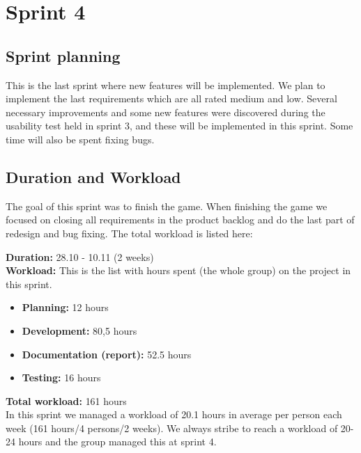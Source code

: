 \section{Sprint 4}

\subsection{Sprint planning}

	This is the last sprint where new features will be implemented. We plan to implement the last 
	requirements which are all rated medium and low. Several necessary improvements and some new 
	features were discovered during the usability test held in sprint 3, and these will be implemented 
	in this sprint. Some time will also be spent fixing bugs.

\subsection{Duration and Workload}

	The goal of this sprint was to finish the game. When finishing the game we focused on closing all
	requirements in the product backlog and do the last part of redesign and bug fixing. The total
	workload is listed here:

	{\bf Duration:} 28.10 - 10.11 (2 weeks)\\
	{\bf Workload:} This is the list with hours spent (the whole group) on the project in this sprint.
	\begin{itemize}
		\item {\bf Planning:}  12 hours
		\item {\bf Development:}  80,5 hours
		\item {\bf Documentation (report):} 52.5 hours
		\item {\bf Testing:} 16 hours
	\end{itemize}
	{\bf Total workload: }  161 hours \\

	In this sprint we managed a workload of 20.1 hours in average per person each week (161 hours/4 persons/2 weeks). We always stribe to reach a workload of 20-24 hours and the group managed this 
	at sprint 4.  

\clearpage
